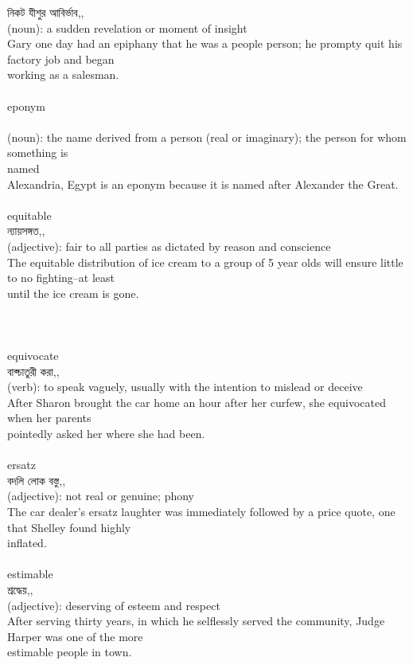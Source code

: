 \documentclass{article}
\begin{document}
{নিকট যীশুর আবির্ভাব,,}\\
{(noun): a sudden revelation or moment of insight\\Gary one day had an epiphany that he was a people person; he prompty quit his factory job and began\\working as a salesman.\\}\\
{eponym}\\
{}\\
{(noun): the name derived from a person (real or imaginary); the person for whom something is\\named\\Alexandria, Egypt is an eponym because it is named after Alexander the Great.\\}\\
{equitable}\\
{ন্যায়সঙ্গত,,}\\
{(adjective): fair to all parties as dictated by reason and conscience\\The equitable distribution of ice cream to a group of 5 year olds will ensure little to no fighting--at least\\until the ice cream is gone.\\\\                                                                                \\}\\
{equivocate}\\
{বাক্চাতুরী করা,,}\\
{(verb): to speak vaguely, usually with the intention to mislead or deceive\\After Sharon brought the car home an hour after her curfew, she equivocated when her parents\\pointedly asked her where she had been.\\}\\
{ersatz}\\
{বদলি লোক বস্তু,,}\\
{(adjective): not real or genuine; phony\\The car dealer's ersatz laughter was immediately followed by a price quote, one that Shelley found highly\\inflated.\\}\\
{estimable}\\
{শ্রদ্ধেয়,,}\\
{(adjective): deserving of esteem and respect\\After serving thirty years, in which he selflessly served the community, Judge Harper was one of the more\\estimable people in town.\\}\\
\end{document}
